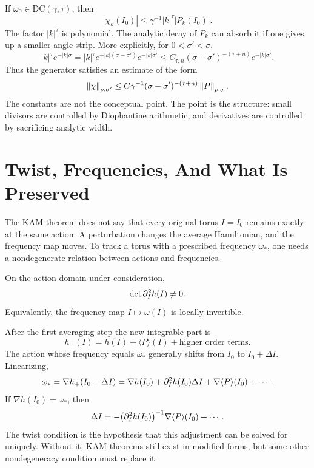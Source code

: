 If \(\omega_0\in\mathrm{DC}(\gamma,\tau)\), then
\[
        |\chi_k(I_0)|
        \le
        \gamma^{-1}|k|^\tau |P_k(I_0)|.
\]
The factor \(|k|^\tau\) is polynomial.  The analytic decay of \(P_k\) can
absorb it if one gives up a smaller angle strip.  More explicitly, for
\(0<\sigma'<\sigma\),
\[
        |k|^\tau e^{-|k|\sigma}
        =
        |k|^\tau e^{-|k|(\sigma-\sigma')}e^{-|k|\sigma'}
        \le
        C_{\tau,n}(\sigma-\sigma')^{-(\tau+n)}e^{-|k|\sigma'} .
\]
Thus the generator satisfies an estimate of the form
\[
        \left\lVert \chi\right\rVert_{\rho,\sigma'}
        \le
        C\gamma^{-1}(\sigma-\sigma')^{-(\tau+n)}
        \left\lVert P\right\rVert_{\rho,\sigma}.
\]
The constants are not the conceptual point.  The point is the structure:
small divisors are controlled by Diophantine arithmetic, and derivatives are
controlled by sacrificing analytic width.

\section{Twist, Frequencies, And What Is Preserved}
\label{sec:kam-twist-fixed-frequency}

The KAM theorem does not say that every original torus \(I=I_0\) remains
exactly at the same action.  A perturbation changes the average Hamiltonian,
and the frequency map moves.  To track a torus with a prescribed frequency
\(\omega_*\), one needs a nondegenerate relation between actions and
frequencies.

\begin{hypothesis}
On the action domain under consideration,
\[
        \det \partial_I^2 h(I)\ne0 .
\]
Equivalently, the frequency map \(I\mapsto \omega(I)\) is locally invertible.
\end{hypothesis}

After the first averaging step the new integrable part is
\[
        h_+(I)=h(I)+\langle P\rangle(I)+\text{higher order terms}.
\]
The action whose frequency equals \(\omega_*\) generally shifts from \(I_0\) to
\(I_0+\Delta I\).  Linearizing,
\[
        \omega_*=
        \nabla h_+(I_0+\Delta I)
        =
        \nabla h(I_0)
        +
        \partial_I^2h(I_0)\Delta I
        +
        \nabla\langle P\rangle(I_0)
        +\cdots .
\]
If \(\nabla h(I_0)=\omega_*\), then
\[
        \Delta I
        =
        -\bigl(\partial_I^2h(I_0)\bigr)^{-1}\nabla\langle P\rangle(I_0)
        +\cdots .
\]
The twist condition is the hypothesis that this adjustment can be solved for
uniquely.  Without it, KAM theorems still exist in modified forms, but some
other nondegeneracy condition must replace it.

